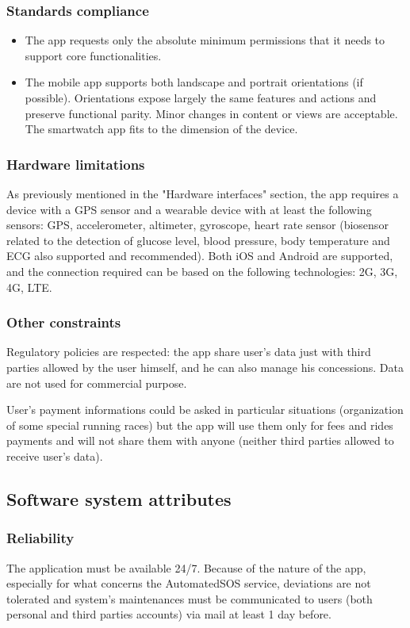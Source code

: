 \subsubsection{Standards compliance}
\begin{itemize}
\item The app requests only the absolute minimum permissions that it needs to support core functionalities.
\item The mobile app supports both landscape and portrait orientations (if possible). Orientations expose largely the same features and actions and preserve functional parity. Minor changes in content
or views are acceptable. The smartwatch app fits to the dimension of the device.
\end{itemize}

\subsubsection{Hardware limitations}
As previously mentioned in the "Hardware interfaces" section, the app requires a device with a GPS sensor and a wearable device with at least the following sensors: GPS, accelerometer, altimeter, gyroscope, heart rate sensor (biosensor related to the detection of glucose level, blood pressure, body temperature and ECG also supported and recommended). Both iOS and Android are supported, and the connection required can be based on the following technologies: 2G, 3G, 4G, LTE.

\subsubsection{Other constraints}
Regulatory policies are respected: the app share user's data just with third parties allowed by the user himself, and he can also manage his concessions. Data are not used for commercial purpose.

User's payment informations could be asked in particular situations (organization of some special running races) but the app will use them only for fees and rides payments and will not share them with anyone (neither third parties allowed to receive user's data).

\subsection{Software system attributes}
\subsubsection{Reliability}
The application must be available 24/7. Because of the nature of the app, especially for what concerns the AutomatedSOS service, deviations are not tolerated and system's maintenances must be communicated to users (both personal and third parties accounts) via mail at least 1 day before.

